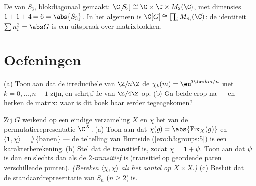 \begin{omfigure}

{\small De  van $S_3$, blokdiagonaal
gemaakt: $\C[S_3] \cong \C \times \C \times M_2(\C)$, met
dimensies $1 + 1 + 4 = 6 = \abs{S_3}$. In het algemeen is $\C[G]
\cong \prod_i M_{n_i}(\C)$: de identiteit $\sum n_i^2 = \abs G$ is
een uitspraak over matrixblokken.}
\end{omfigure}

\section{Oefeningen}

\begin{exercise}[$\star$]\label{exo:b3:representations:1}
(a) Toon aan dat de irreducibele  van $\Z/n\Z$ de
$\chi_k(\bar m) = \eu^{2\iu\pi km/n}$ met $k = 0, \dots, n-1$
zijn, en schrijf de  van $\Z/4\Z$ op.
(b) Ga beide  erop na --- en herken de
matrix: waar is dit boek haar eerder tegengekomen?
\end{exercise}

\begin{exercise}[$\star$]\label{exo:b3:representations:2}
Zij $G$ werkend op een eindige verzameling $X$ en $\chi$ het
 van de permutatierepresentatie $\C^X$.
(a) Toon aan dat $\chi(g) = \abs{\operatorname{Fix}_X(g)}$ en
$\langle \mathbf 1, \chi\rangle = \#\{\text{banen}\}$ --- de
teltelling van Burnside (\cref{exo:b3:groups:5}) is een
karakterberekening.
(b) Stel dat de  transitief is, zodat $\chi = \mathbf 1 +
\psi$. Toon aan dat $\psi$  is dan en slechts dan als
de  \emph{$2$-transitief} is (transitief op geordende paren
verschillende punten). \emph{(Bereken $\langle\chi,\chi\rangle$
als het aantal  op $X \times X$.)}
(c) Besluit dat de standaardrepresentatie van $S_n$ ($n \geq 2$)
 is.
\end{exercise}

